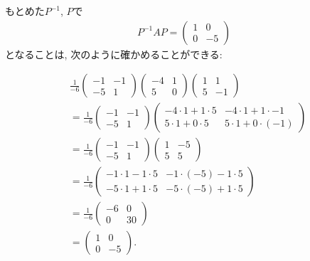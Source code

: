\begin{checkanswer}%
  もとめた$P^{-1}$, $P$で
  \begin{align*}
    P^{-1}AP=\begin{pmatrix}1&0\\0&-5\end{pmatrix}
  \end{align*}
  となることは,
  次のように確かめることができる:

  \begin{align*}
    &\frac{1}{-6}\begin{pmatrix}-1&-1\\-5&1\end{pmatrix}
    \begin{pmatrix}-4&1\\5&0\end{pmatrix}
    \begin{pmatrix}1&1\\5&-1\end{pmatrix}\\
   &=
    \frac{1}{-6}\begin{pmatrix}-1&-1\\-5&1\end{pmatrix}
    \begin{pmatrix}-4\cdot 1+1\cdot 5&-4\cdot 1+1\cdot -1\\5\cdot 1+0\cdot5&5\cdot 1+0\cdot(-1)\end{pmatrix}\\
   &=
    \frac{1}{-6}\begin{pmatrix}-1&-1\\-5&1\end{pmatrix}
    \begin{pmatrix}1&-5\\5&5\end{pmatrix}\\
   &=
    \frac{1}{-6}\begin{pmatrix}-1\cdot 1-1\cdot 5&-1\cdot(-5)-1\cdot 5\\-5\cdot 1+1\cdot 5&-5\cdot(-5)+1\cdot 5\end{pmatrix}\\
   &=
    \frac{1}{-6}\begin{pmatrix}-6&0\\0&30\end{pmatrix}\\
   &=
    \begin{pmatrix}1&0\\0&-5\end{pmatrix}.
  \end{align*}
\end{checkanswer}

